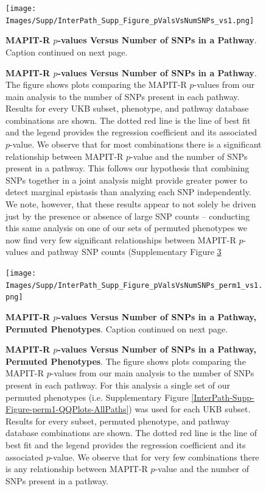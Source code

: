 \documentclass[12pt, a4paper]{article}
\begin{document}
\begin{figure}[htbp]
\centering
\vspace*{-2cm}
\texttt{[image: Images/Supp/InterPath\_Supp\_Figure\_pValsVsNumSNPs\_vs1.png]}
\caption[TBD]{\textbf{MAPIT-R $p$-values Versus Number of SNPs in a Pathway}. Caption continued on next page.}
\label{InterPath-Supp-Figure-pValsVsNumSNPs}
\end{figure}
\clearpage

\addtocounter{figure}{-1}
\begin{figure} [t!]
  \caption{\textbf{MAPIT-R $p$-values Versus Number of SNPs in a Pathway}. The figure shows plots comparing the MAPIT-R $p$-values from our main analysis to the number of SNPs present in each pathway. Results for every UKB subset, phenotype, and pathway database combinations are shown. The dotted red line is the line of best fit and the legend provides the regression coefficient and its associated $p$-value. We observe that for most combinations there is a significant relationship between MAPIT-R $p$-value and the number of SNPs present in a pathway. This follows our hypothesis that combining SNPs together in a joint analysis might provide greater power to detect marginal epistasis than analyzing each SNP independently. We note, however, that these results appear to not solely be driven just by the presence or absence of large SNP counts -- conducting this same analysis on one of our sets of permuted phenotypes we now find very few significant relationships between MAPIT-R $p$-values and pathway SNP counts (Supplementary Figure \ref{InterPath-Supp-Figure-pValsVsNumSNPs-perm1}}
\label{InterPath-Supp-Figure-pValsVsNumSNPs-Caption}
\end{figure}
\clearpage

\setlength{\footskip}{3cm}
\begin{figure}[htbp]
\centering
\vspace*{-2cm}
\texttt{[image: Images/Supp/InterPath\_Supp\_Figure\_pValsVsNumSNPs\_perm1\_vs1.png]}
\caption[TBD]{\textbf{MAPIT-R $p$-values Versus Number of SNPs in a Pathway, Permuted Phenotypes}. Caption continued on next page.}
\label{InterPath-Supp-Figure-pValsVsNumSNPs-perm1}
\end{figure}
\clearpage
\setlength{\footskip}{1cm}

\addtocounter{figure}{-1}
\begin{figure} [t!]
  \caption{\textbf{MAPIT-R $p$-values Versus Number of SNPs in a Pathway, Permuted Phenotypes}. The figure shows plots comparing the MAPIT-R $p$-values from our main analysis to the number of SNPs present in each pathway. For this analysis a single set of our permuted phenotypes (i.e. Supplementary Figure \ref{InterPath-Supp-Figure-perm1-QQPlots-AllPaths}) was used for each UKB subset. Results for every subset, permuted phenotype, and pathway database combinations are shown. The dotted red line is the line of best fit and the legend provides the regression coefficient and its associated $p$-value. We observe that for very few combinations there is any relationship between MAPIT-R $p$-value and the number of SNPs present in a pathway.}
\label{InterPath-Supp-Figure-pValsVsNumSNPs-perm1-Caption}
\end{figure}
\clearpage
\end{document}
